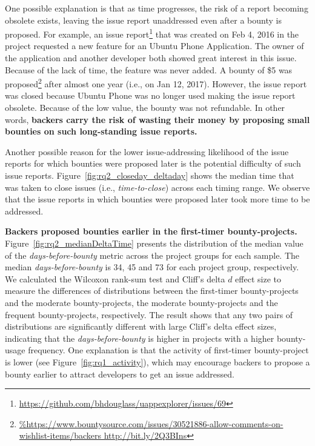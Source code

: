 One possible explanation is that as time progresses, the risk of a report becoming obsolete exists, leaving the issue report unaddressed even after a bounty is proposed.
For example, an issue report\footnote{\url{https://github.com/bhdouglass/uappexplorer/issues/69}} that was created on Feb 4, 2016 in the  project requested a new feature for an Ubuntu Phone Application.
The owner of the application and another developer both showed great interest in this issue. Because of the lack of time, the feature was never added. A bounty of \$5 was proposed\footnote{\url{%
http://bit.ly/2Q3BIns}} after almost one year (i.e., on Jan 12, 2017).
However, the issue report was closed because Ubuntu Phone was no longer used making the issue report obsolete. Because of the low value, the bounty was not refundable. In other words,\textbf{ backers carry the risk of wasting their money by proposing small bounties on such long-standing issue reports.}

Another possible reason for the lower issue-addressing likelihood of the issue reports for which bounties were proposed later is the potential difficulty of such issue reports.
Figure~\ref{fig:rq2_closeday_deltaday} shows the median time that was taken to close issues (i.e., \textit{time-to-close}) across each timing range. We observe that the issue reports in which bounties were proposed later took more time to be addressed.




\textbf{Backers proposed bounties earlier in the first-timer bounty-projects.}
Figure~\ref{fig:rq2_medianDeltaTime} presents the distribution of the median value of the \textit{days-before-bounty} metric across the project groups for each sample. The median \textit{days-before-bounty} is 34, 45 and 73 for each project group, respectively.
We calculated the Wilcoxon rank-sum test and Cliff's delta $d$ effect size to measure the differences of distributions between the first-timer bounty-projects and the moderate bounty-projects, the moderate bounty-projects and the frequent bounty-projects, respectively. The result shows that any two pairs of distributions are significantly different with large Cliff's delta effect sizes, indicating that the \textit{days-before-bounty} is higher in projects with a higher bounty-usage frequency.
One explanation is that the activity of first-timer bounty-project is lower (see Figure~\ref{fig:rq1_activity}), which may encourage backers to propose a bounty earlier to attract developers to get an issue addressed.





